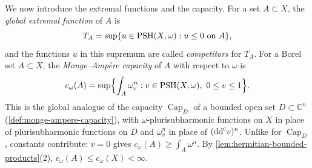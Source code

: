 We now introduce the extremal functions and the capacity. For a set $A\subset X$, the \emph{global extremal function} of $A$ is
\[
 T_A=\sup\{u\in\mathrm{PSH}(X,\omega):u\leq0\text{ on }A\},
\]
and the functions $u$ in this supremum are called \emph{competitors} for $T_A$. For a Borel set $A\subset X$, the \emph{Monge--Amp\`ere capacity} of $A$ with respect to $\omega$ is
\[
 c_\omega(A)=\sup\Bigl\{\int_A\omega_v^n:v\in\PSH(X,\omega),\ 0\leq v\leq1\Bigr\}.
\]
This is the global analogue of the capacity $\operatorname{Cap}_D$ of a bounded open set $D\subset\mathbb C^n$ (\cref{def:monge-ampere-capacity}), with $\omega$-plurisubharmonic functions on $X$ in place of plurisubharmonic functions on $D$ and $\omega_v^n$ in place of $(\mathrm{dd}^{\mathrm{c}} v)^n$. Unlike for $\operatorname{Cap}_D$, constants contribute: $v=0$ gives $c_\omega(A)\geq\int_A\omega^n$. By \cref{lem:hermitian-bounded-products}(2), $c_\omega(A)\leq c_\omega(X)<\infty$.

